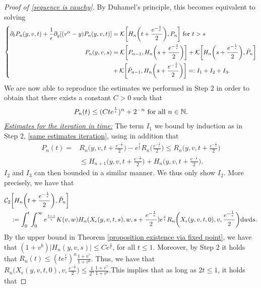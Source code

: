 \documentclass[11pt]{article}
\numberwithin{equation}{section}
\newcommand{\der}{\textup{d}}
\begin{document}
\begin{proof}[Proof of \eqref{sequence is cauchy}]
  
    By Duhamel's principle, this becomes equivalent to solving
    \begin{equation}
\left\{\begin{aligned}
\partial_t P_n(y,v,t)+\frac{1}{\epsilon}\partial_{y}[(v^{\alpha}-y) P_n(y,v,t)]&=\mathcal{K}\bigg[H_{n}\bigg(t+\frac{e^{-\frac{1}{\epsilon}}}{2}\bigg),P_n\bigg]\textup{ for } t>s\\
P_{n}(y,v,s)&=\mathcal{K}\bigg[P_{n-1},H_{n}\bigg(s+\frac{e^{-\frac{1}{\epsilon}}}{2}\bigg)\bigg] +\mathcal{K}\bigg[H_{n}\bigg(s+\frac{e^{-\frac{1}{\epsilon}}}{2}\bigg), \tilde{P}_{n}\bigg]\\
&+\mathcal{K}\bigg[ \tilde{P}_{n-1},H_{n}\bigg(s+\frac{e^{-\frac{1}{\epsilon}}}{2}\bigg)\bigg]=:I_{1}+I_{2}+I_{3}.
   \end{aligned}\right.
   \end{equation}
   We are now able to reproduce the estimates we performed in Step $2$ in order to obtain that there exists a constant $C>0$ such that
\begin{align}\label{bound pn}
P_{n}(t)\leq     (Ct e^{\frac{1}{\epsilon}})^{n}+2^{-n} \textup{ for all } n\in\mathbb{N}.
\end{align}
\textit{\underline{Estimates for the iteration in time:}} The term $I_{1}$ we bound by induction as in Step $2$, \eqref{same estimates iteration}, using in addition that
\begin{align*}
P_{n}(t)=& R_{n}\bigg(y,v,t+\frac{e^{-\frac{1}{\epsilon}}}{2}\bigg)- e^{\frac{t}{\epsilon}}R_{n}\bigg(\frac{e^{-\frac{1}{\epsilon}}}{2}\bigg)\leq R_{n}\bigg(y,v,t+\frac{e^{-\frac{1}{\epsilon}}}{2}\bigg)\\
&\leq H_{n+1}\bigg(y,v,t+\frac{e^{-\frac{1}{\epsilon}}}{2}\bigg)+H_{n}\bigg(y,v,t+\frac{e^{-\frac{1}{\epsilon}}}{2}\bigg).
\end{align*}
$I_{2}$ and $I_{3}$ can then bounded in a similar manner. We thus only show $I_{2}$. More precisely, we have that
\begin{align*}
    \mathcal{C}_{2}& \bigg[H_{n}\bigg(t+\frac{e^{-\frac{1}{\epsilon}}}{2}\bigg),\tilde{P}_{n}\bigg]\\
    &:=\int_{0}^{t}\int_{0}^{\infty}e^{\frac{t-s}{\epsilon}}K(v,w)H_{n}(X_{\epsilon}(y,v,t,s),w,s+\frac{e^{-\frac{1}{\epsilon}}}{2})e^{\frac{s}{\epsilon}}R_{n}\bigg(X_{\epsilon}(y,v,t,0),v,\frac{e^{-\frac{1}{\epsilon}}}{2}\bigg)\der w\der s.
\end{align*}
By the upper bound in Theorem \ref{proposition existence via fixed point}, we have that $(1+v^{b})|H_{n}(y,v,s)|\leq Ce^{\frac{s}{\epsilon}}$, for all $t\leq 1$. Moreover, by Step $2$ it holds that $R_{n}(t)\leq (te^{\frac{1}{\epsilon}})^{n}\frac{1+v^{\gamma}}{1+v^{b}}$. Thus, we have that $R_{n}\big(X_{\epsilon}(y,v,t,0),v,\frac{e^{-\frac{1}{\epsilon}}}{2}\big)\leq \frac{1}{2^{n}}\frac{1+v^{\gamma}}{1+v^{b}}$.This implies that as long as $2t\leq 1$, it holds that

\end{proof}
\end{document}
